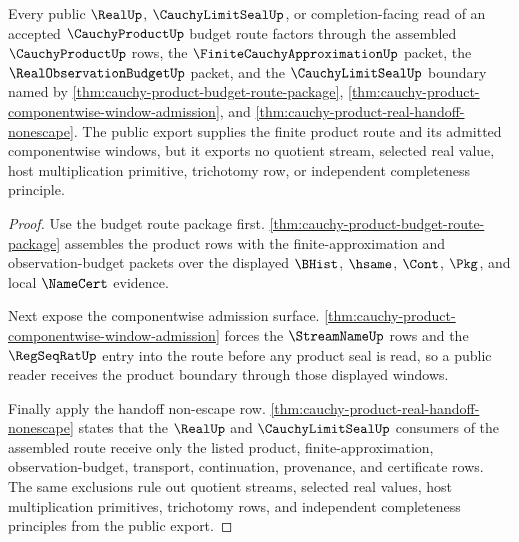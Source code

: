 \begin{theorem}
\label{thm:cauchy-product-public-budget-route-export}
Every public $\RealUp$, $\CauchyLimitSealUp$, or completion-facing read of an accepted $\CauchyProductUp$ budget route factors through the assembled $\CauchyProductUp$ rows, the $\FiniteCauchyApproximationUp$ packet, the $\RealObservationBudgetUp$ packet, and the $\CauchyLimitSealUp$ boundary named by \autoref{thm:cauchy-product-budget-route-package}, \autoref{thm:cauchy-product-componentwise-window-admission}, and \autoref{thm:cauchy-product-real-handoff-nonescape}. The public export supplies the finite product route and its admitted componentwise windows, but it exports no quotient stream, selected real value, host multiplication primitive, trichotomy row, or independent completeness principle.
\end{theorem}
\begin{proof}
Use the budget route package first. \autoref{thm:cauchy-product-budget-route-package} assembles the product rows with the finite-approximation and observation-budget packets over the displayed $\BHist$, $\hsame$, $\Cont$, $\Pkg$, and local $\NameCert$ evidence.

Next expose the componentwise admission surface. \autoref{thm:cauchy-product-componentwise-window-admission} forces the $\StreamNameUp$ rows and the $\RegSeqRatUp$ entry into the route before any product seal is read, so a public reader receives the product boundary through those displayed windows.

Finally apply the handoff non-escape row. \autoref{thm:cauchy-product-real-handoff-nonescape} states that the $\RealUp$ and $\CauchyLimitSealUp$ consumers of the assembled route receive only the listed product, finite-approximation, observation-budget, transport, continuation, provenance, and certificate rows. The same exclusions rule out quotient streams, selected real values, host multiplication primitives, trichotomy rows, and independent completeness principles from the public export.
\end{proof}

